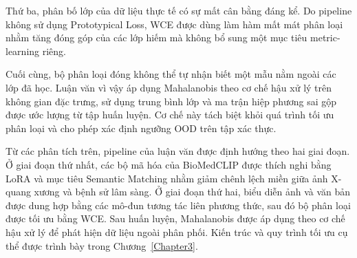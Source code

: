 Thứ ba, phân bố lớp của dữ liệu thực tế có sự mất cân bằng đáng kể. Do pipeline không sử dụng Prototypical Loss, WCE được dùng làm hàm mất mát phân loại nhằm tăng đóng góp của các lớp hiếm mà không bổ sung một mục tiêu metric-learning riêng.

Cuối cùng, bộ phân loại đóng không thể tự nhận biết một mẫu nằm ngoài các lớp đã học. Luận văn vì vậy áp dụng Mahalanobis theo cơ chế hậu xử lý trên không gian đặc trưng, sử dụng trung bình lớp và ma trận hiệp phương sai gộp được ước lượng từ tập huấn luyện. Cơ chế này tách biệt khỏi quá trình tối ưu phân loại và cho phép xác định ngưỡng OOD trên tập xác thực.

Từ các phân tích trên, pipeline của luận văn được định hướng theo hai giai đoạn. Ở giai đoạn thứ nhất, các bộ mã hóa của BioMedCLIP được thích nghi bằng LoRA và mục tiêu Semantic Matching nhằm giảm chênh lệch miền giữa ảnh X-quang xương và bệnh sử lâm sàng. Ở giai đoạn thứ hai, biểu diễn ảnh và văn bản được dung hợp bằng các mô-đun tương tác liên phương thức, sau đó bộ phân loại được tối ưu bằng WCE. Sau huấn luyện, Mahalanobis được áp dụng theo cơ chế hậu xử lý để phát hiện dữ liệu ngoài phân phối. Kiến trúc và quy trình tối ưu cụ thể được trình bày trong Chương~\ref{Chapter3}.
